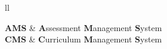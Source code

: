 \documentclass[
11pt, %
english, %
spanish,
singlespacing, %
liststotoc, %
headsepline, %
]{MastersDoctoralThesis} %
\begin{document}
\renewcommand{\listtablename}{Lista de Tablas}
\listoftables %


\begin{abbreviations}{ll} %

\textbf{AMS} & \textbf{A}ssessment \textbf{M}anagement \textbf{S}ystem\\
\textbf{CMS} & \textbf{C}urriculum \textbf{M}anagement \textbf{S}ystem \\

\end{abbreviations}









\end{document}
